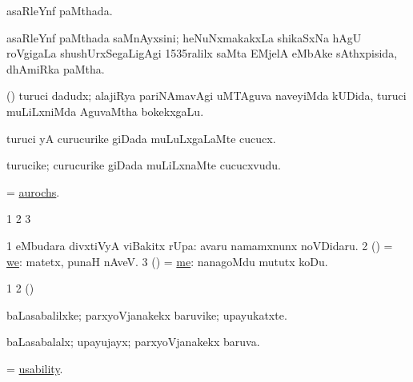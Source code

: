 \bentry
{} 
\gl{\gu}
\expl{}
\bmng
asaRleYnf paMthada. 
\emng
\eentry

\bentry
{} 
\gl{\nA}
\expl{}
\bmng
asaRleYnf paMthada saMnAyxsini; heNuNxmakakxLa shikaSxNa hAgU roVgigaLa shushUrxSegaLigAgi 1535ralilx saMta EMjelA eMbAke sAthxpisida, dhAmiRka paMtha. 
\emng
\eentry

\bentry
{} 
\gl{\nA}
\expl{}
\bmng
(\veYshA) turuci dadudx; alajiRya pariNAmavAgi uMTAguva naveyiMda kUDida, turuci muLiLxniMda AguvaMtha bokekxgaLu. 
\emng
\eentry

\bentry
{} 
\gl{\sakirx}
\expl{}
\bmng
turuci yA curucurike giDada muLuLxgaLaMte cucucx. 
\emng
\eentry

\bentry
{} 
\gl{\nA}
\expl{}
\bmng
turucike; curucurike giDada muLiLxnaMte cucucxvudu. 
\emng
\eentry

\bentry
{} 
\gl{\nA}
\expl{}
\bmng
= \hyperref{kandict_a.pdf}{A}{aurochs}{aurochs}. 
\emng
\eentry

\bentry
{}
\gl{\saMkiSx}
\expl{}
\bmng
\bnum
\num{1}  
\num{2}  
\num{3}  
\enum
\emng
\eentry

\bentry
{} 
\gl{\sanA}
\expl{}
\bmng
\bnum
\num{1}  eMbudara divxtiVyA viBakitx rUpa:  avaru namamxnunx noVDidaru. 
\num{2} (\AmA) = \hyperref{kandict_w.pdf}{W}{we}{we}:  matetx, punaH nAveV. 
\num{3} (\AmA) = \hyperref{kandict_m.pdf}{M}{me(1)}{me}:  nanagoMdu mututx koDu. 
\enum
\emng
\eentry

\bentry
{} 
\gl{\saMkiSx}
\expl{}
\bmng
\bnum
\num{1}  
\num{2} (\ame)  
\enum
\emng
\eentry

\bentry
{} 
\gl{\nA}
\expl{}
\bmng
baLasabalilxke; parxyoVjanakekx baruvike; upayukatxte. 
\emng
\eentry

\bentry
{} 
\gl{\gu}
\expl{}
\bmng
baLasabalalx; upayujayx; parxyoVjanakekx baruva. 
\emng
\eentry

\bentry
{} 
\gl{\nA}
\expl{}
\bmng
= \hyperlink{usability}{usability}. 
\emng
\eentry

